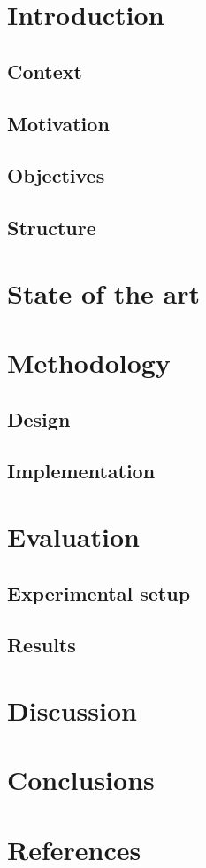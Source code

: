 \documentclass[12pt,english]{article}
\begin{document}


\thispagestyle{empty}
\newpage
\tableofcontents{}
\newpage
\listoffigures
\thispagestyle{empty}
\newpage

\section{Introduction}

\subsection{Context}

\subsection{Motivation}

\subsection{Objectives}

\subsection{Structure}


\section{State of the art}

\section{Methodology}

\subsection{Design}

\subsection{Implementation}


\section{Evaluation}

\subsection{Experimental setup}

\subsection{Results}


\section{Discussion}

\section{Conclusions}

\section{References}
\end{document}
